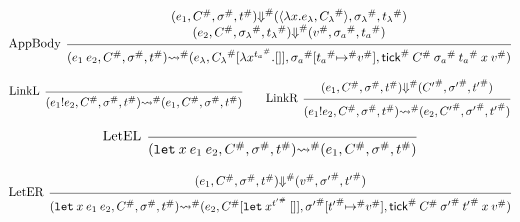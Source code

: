\documentclass{article}
\theoremstyle{definition}
\newcommand*{\A}[1]{{#1}^{\#}}
\newcommand*{\link}[2]{{#1}\mathtt{!}{#2}}
\newcommand*{\tick}{\mathsf{tick}}
\begin{document}
\[
  \begin{prooftree}
    \hypo{
      \begin{matrix}
        (e_{1}, \A{C}, \A{\sigma}, \A{t})
        \A{\Downarrow}
        (\langle\lambda x.e_{\lambda}, \A{C_{\lambda}}\rangle, \A{\sigma_{\lambda}}, \A{t_{\lambda}}) \\
        (e_{2}, \A{C}, \A{\sigma_{\lambda}}, \A{t_{\lambda}})
        \A{\Downarrow}
        (\A{v}, \A{\sigma_{a}}, \A{t_{a}})
      \end{matrix}
    }
    \infer[left label={AppBody}]1{
    (e_{1}\:e_{2}, \A{C}, \A{\sigma}, \A{t})
    \A\rightsquigarrow
    (e_{\lambda}, \A{C_{\lambda}}[\lambda x^{\A{t_{a}}}.[]], \A{\sigma_{a}}[\A{t_{a}}\A{\mapsto} \A{v}], \A{\tick}\:\A{C}\:\A{\sigma_a}\:\A{t_{a}}\:x\:\A{v})
    }
  \end{prooftree}
\]

\[
  \begin{prooftree}
    \infer[left label=LinkL]0{
    (\link{e_{1}}{e_{2}}, \A{C}, \A{\sigma}, \A{t})
    \A\rightsquigarrow
    (e_{1}, \A{C}, \A{\sigma}, \A{t})
    }
  \end{prooftree}\qquad
  \begin{prooftree}
    \hypo{
      \begin{matrix}
        (e_{1}, \A{C}, \A{\sigma}, \A{t})
        \A{\Downarrow}
        (\A{C'}, \A{\sigma'}, \A{t'})
      \end{matrix}
    }
    \infer[left label=LinkR]1{
    (\link{e_{1}}{e_{2}}, \A{C}, \A{\sigma}, \A{t})
    \A\rightsquigarrow
    (e_{2}, \A{C'}, \A{\sigma'}, \A{t'})
    }
  \end{prooftree}
\]

\[
  \begin{prooftree}
    \infer[left label=LetEL]0{
    (\mathtt{let}\:x\:e_1\:e_2, \A{C}, \A{\sigma}, \A{t})
    \A\rightsquigarrow
    (e_{1}, \A{C}, \A{\sigma}, \A{t})
    }
  \end{prooftree}
\]

\[
  \begin{prooftree}
    \hypo{
      \begin{matrix}
        (e_{1}, \A{C}, \A{\sigma}, \A{t})
        \A\Downarrow
        (\A{v}, \A{\sigma'}, \A{t'})
      \end{matrix}
    }
    \infer[left label=LetER]1{
    (\mathtt{let}\:x\:e_1\:e_2, \A{C}, \A{\sigma}, \A{t})
    \A\rightsquigarrow
    (e_{2}, \A{C}[\mathtt{let}\:x^{\A{t'}}\:[]], \A{\sigma'}[\A{t'}\A{\mapsto} \A{v}], \A{\tick}\:\A{C}\:\A{\sigma'}\:\A{t'}\:x\:\A{v})
    }
  \end{prooftree}
\]
\end{document}
